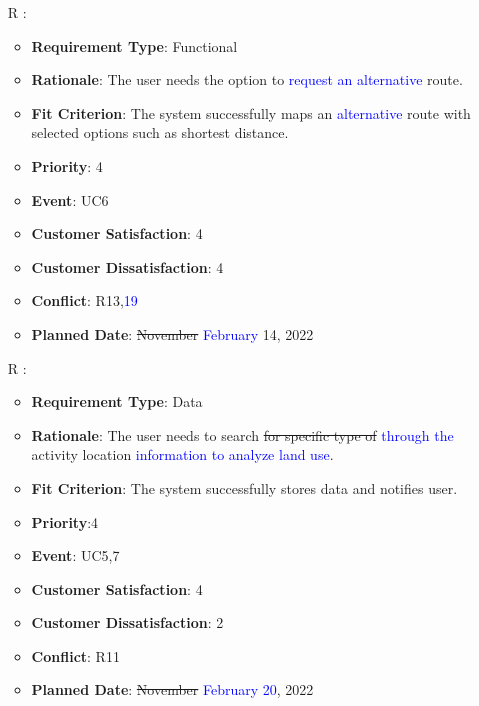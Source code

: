 \documentclass[12pt, titlepage]{article}
\newcounter{reqnum} %
\begin{document}
\begin{itemize}
\item[R\refstepcounter{reqnum}\thereqnum
\label{R_Inputs_1}:] 
\begin{itemize}
    \item \textbf{Requirement Type}: Functional
    \item \textbf{Rationale}: The user needs the option to \textcolor{blue}{request an alternative} route. 
    \item \textbf{Fit Criterion}: The system successfully maps an \textcolor{blue}{alternative} route with selected options such as shortest distance. 
    \item \textbf{Priority}: 4
    \item \textbf{Event}: UC6
    \item \textbf{Customer Satisfaction}: 4
    \item \textbf{Customer Dissatisfaction}: 4
    \item \textbf{Conflict}: R13,\textcolor{blue}{19}
    \item \textbf{Planned Date}: \sout{November} \textcolor{blue}{February} 14, 2022
\end{itemize}

\item[R\refstepcounter{reqnum}\thereqnum
\label{R_Inputs_1}:] 
\begin{itemize}
    \item \textbf{Requirement Type}: Data
    \item \textbf{Rationale}: The user needs to search \sout{for specific type of} \textcolor{blue}{through the} activity location \textcolor{blue}{information to analyze land use}.
    \item \textbf{Fit Criterion}: The system successfully stores data and notifies user. 
    \item \textbf{Priority}:4
    \item \textbf{Event}: UC5,7
    \item \textbf{Customer Satisfaction}: 4
    \item \textbf{Customer Dissatisfaction}: 2
    \item \textbf{Conflict}: R11
    \item \textbf{Planned Date}: \sout{November} \textcolor{blue}{February 20}, 2022
\end{itemize}


\end{itemize}
\end{document}
